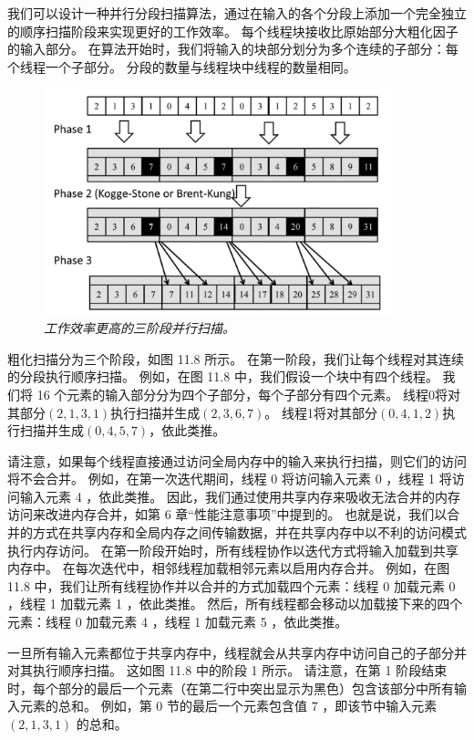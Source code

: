 我们可以设计一种并行分段扫描算法，通过在输入的各个分段上添加一个完全独立的顺序扫描阶段来实现更好的工作效率。 
每个线程块接收比原始部分大粗化因子的输入部分。 
在算法开始时，我们将输入的块部分划分为多个连续的子部分：每个线程一个子部分。 分段的数量与线程块中线程的数量相同。

\begin{figure}[H]
	\centering
	\includegraphics[width=0.9\textwidth]{figs/F11.8.png}
	\caption{\textit{工作效率更高的三阶段并行扫描。}}
\end{figure}

粗化扫描分为三个阶段，如图 11.8 所示。 在第一阶段，我们让每个线程对其连续的分段执行顺序扫描。 
例如，在图 11.8 中，我们假设一个块中有四个线程。 我们将 16 个元素的输入部分分为四个子部分，每个子部分有四个元素。 
线程0将对其部分$(2,1,3,1)$执行扫描并生成$(2,3,6,7)$。 
线程1将对其部分$(0,4,1,2)$执行扫描并生成$(0,4,5,7)$，依此类推。

请注意，如果每个线程直接通过访问全局内存中的输入来执行扫描，则它们的访问将不会合并。 
例如，在第一次迭代期间，线程 0 将访问输入元素 0 ，线程 1 将访问输入元素 4 ，依此类推。 
因此，我们通过使用共享内存来吸收无法合并的内存访问来改进内存合并，如第 6 章“性能注意事项”中提到的。 
也就是说，我们以合并的方式在共享内存和全局内存之间传输数据，并在共享内存中以不利的访问模式执行内存访问。 
在第一阶段开始时，所有线程协作以迭代方式将输入加载到共享内存中。 在每次迭代中，相邻线程加载相邻元素以启用内存合并。 
例如，在图 11.8 中，我们让所有线程协作并以合并的方式加载四个元素：线程 0 加载元素 0 ，线程 1 加载元素 1 ，依此类推。 
然后，所有线程都会移动以加载接下来的四个元素：线程 0 加载元素 4 ，线程 1 加载元素 5 ，依此类推。

一旦所有输入元素都位于共享内存中，线程就会从共享内存中访问自己的子部分并对其执行顺序扫描。 这如图 11.8 中的阶段 1 所示。 
请注意，在第 1 阶段结束时，每个部分的最后一个元素（在第二行中突出显示为黑色）包含该部分中所有输入元素的总和。 
例如，第 0 节的最后一个元素包含值 7 ，即该节中输入元素 $(2,1,3,1)$ 的总和。


